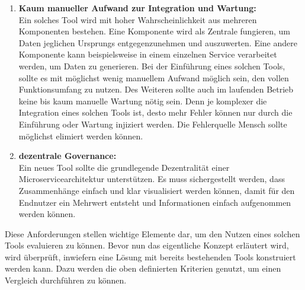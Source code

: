 \begin{enumerate}
\item \textbf{Kaum manueller Aufwand zur Integration und Wartung:}\\
Ein solches Tool wird mit hoher Wahrscheinlichkeit aus mehreren Komponenten bestehen. Eine Komponente wird als Zentrale fungieren, um Daten jeglichen Ursprungs entgegenzunehmen und auszuwerten. Eine andere Komponente kann beispielsweise in einem einzelnen Service verarbeitet werden, um Daten zu generieren. Bei der Einführung eines solchen Tools, sollte es mit möglichst wenig manuellem Aufwand möglich sein, den vollen Funktionsumfang zu nutzen. Des Weiteren sollte auch im laufenden Betrieb keine bis kaum manuelle Wartung nötig sein. Denn je komplexer die Integration eines solchen Tools ist, desto mehr Fehler können nur durch die Einführung oder Wartung injiziert werden. Die Fehlerquelle Mensch sollte möglichst elimiert werden können.

\item \textbf{dezentrale Governance:}\\
Ein neues Tool sollte die grundlegende Dezentralität einer Microservicearchitektur unterstützen. Es muss sichergestellt werden, dass Zusammenhänge einfach und klar visualisiert werden können, damit für den Endnutzer ein Mehrwert entsteht und Informationen einfach aufgenommen werden können.

\end{enumerate}

Diese Anforderungen stellen wichtige Elemente dar, um den Nutzen eines solchen Tools evaluieren zu können. Bevor nun das eigentliche Konzept erläutert wird, wird überprüft, inwiefern eine Lösung mit bereits bestehenden Tools konstruiert werden kann. Dazu werden die oben definierten Kriterien genutzt, um einen Vergleich durchführen zu können. 

